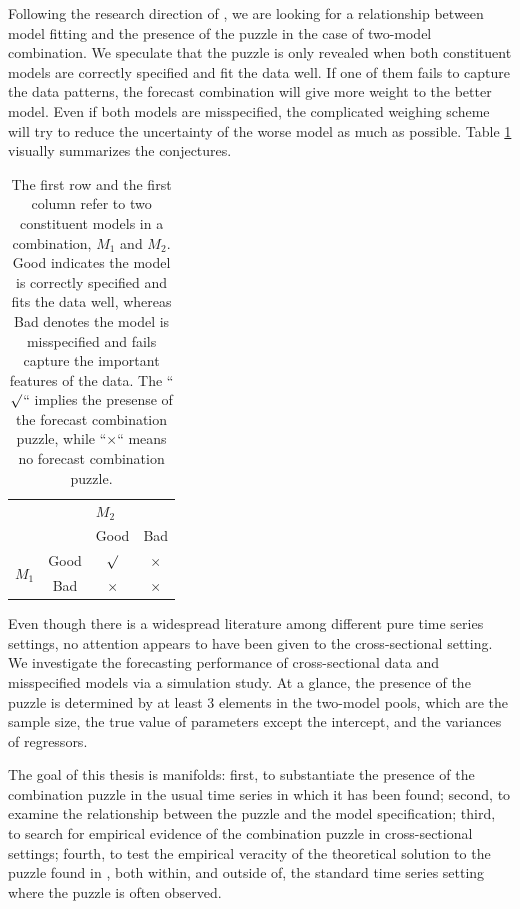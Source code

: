 \documentclass{monashthesis}
\begin{document}
Following the research direction of \textcite{BS16}, we are looking for a relationship between model fitting and the presence of the puzzle in the case of two-model combination. We speculate that the puzzle is only revealed when both constituent models are correctly specified and fit the data well. If one of them fails to capture the data patterns, the forecast combination will give more weight to the better model. Even if both models are misspecified, the complicated weighing scheme will try to reduce the uncertainty of the worse model as much as possible. Table \ref{tab:1} visually summarizes the conjectures.

\begin{table}[ht]
\centering
\begin{tabular}{cccc}
                       &      & \multicolumn{2}{l}{$M_2$} \\
                       &      & Good       & Bad       \\
\multirow{2}{*}{$M_1$} & Good & $\surd$    & $\times$ \\
                       & Bad  & $\times$   & $\times$
\end{tabular}
\caption{The first row and the first column refer to two constituent models in a combination, $M_1$ and $M_2$. Good indicates the model is correctly specified and fits the data well, whereas Bad denotes the model is misspecified and fails capture the important features of the data. The ``$\surd$`` implies the presense of the forecast combination puzzle, while ``$\times$`` means no forecast combination puzzle.}
\label{tab:1}
\end{table}

Even though there is a widespread literature among different pure time series settings, no attention appears to have been given to the cross-sectional setting. We investigate the forecasting performance of cross-sectional data and misspecified models via a simulation study. At a glance, the presence of the puzzle is determined by at least 3 elements in the two-model pools, which are the sample size, the true value of parameters except the intercept, and the variances of regressors.

The goal of this thesis is manifolds: first, to substantiate the presence of the combination puzzle in the usual time series in which it has been found; second, to examine the relationship between the puzzle and the model specification; third, to search for empirical evidence of the combination puzzle in cross-sectional settings; fourth, to test the empirical veracity of the theoretical solution to the puzzle found in \textcite{FZMP23}, both within, and outside of, the standard time series setting where the puzzle is often observed.
\end{document}
